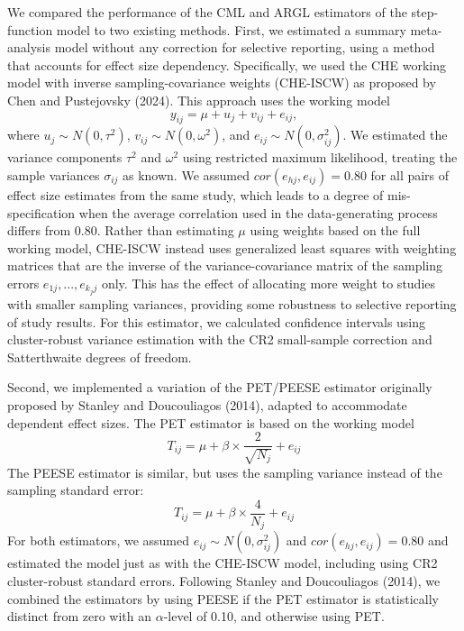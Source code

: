 \documentclass[
  man, donotrepeattitle,floatsintext]{apa7}
\begin{document}
We compared the performance of the CML and ARGL estimators of the step-function model to two
existing methods.
First, we estimated a summary meta-analysis model without any correction for selective reporting, using a method that accounts for effect size dependency.
Specifically, we used the CHE working model with inverse sampling-covariance weights (CHE-ISCW) as proposed by Chen and Pustejovsky (2024).
This approach uses the working model
\begin{equation}
\label{eq:che}
y_{ij} = \mu + u_j + v_{ij} + e_{ij},
\end{equation}
where \(u_j \sim N(0, \tau^2)\), \(v_{ij} \sim N(0, \omega^2)\), and \(e_{ij} \sim N(0, \sigma_{ij}^2)\).
We estimated the variance components \(\tau^2\) and \(\omega^2\) using restricted maximum likelihood, treating the sample variances \(\sigma_{ij}\) as known.
We assumed \(cor(e_{hj},e_{ij} )=0.80\) for all pairs of effect size estimates from the same study, which leads to a
degree of mis-specification when the average correlation used in the data-generating process differs from 0.80.
Rather than estimating \(\mu\) using weights based on the full working model, CHE-ISCW instead uses generalized least squares with weighting matrices that are the inverse of the variance-covariance matrix of the sampling errors \(e_{1j},...,e_{k_j j}\) only.
This has the effect of allocating more weight to studies with smaller sampling variances, providing some robustness to selective reporting of study results.
For this estimator, we calculated confidence intervals using cluster-robust variance estimation with the CR2 small-sample correction and Satterthwaite degrees of freedom.

Second, we implemented a variation of the PET/PEESE estimator originally proposed by Stanley and Doucouliagos (2014), adapted to
accommodate dependent effect sizes. The PET estimator is based on the
working model \begin{equation}
\label{eq:pet}
T_{ij} = \mu + \beta \times \frac{2}{\sqrt{N_j}} + e_{ij}
\end{equation} The PEESE estimator is similar, but uses the sampling
variance instead of the sampling standard error: \begin{equation}
\label{eq:peese}
T_{ij} = \mu + \beta \times \frac{4}{N_j} + e_{ij}
\end{equation} For both estimators, we assumed
\(e_{ij} \sim N(0, \sigma_{ij}^2)\) and \(cor(e_{hj},e_{ij} )=0.80\) and
estimated the model just as with the CHE-ISCW model, including using
CR2 cluster-robust standard errors. Following Stanley and Doucouliagos (2014), we combined
the estimators by using PEESE if the PET estimator is statistically
distinct from zero with an \(\alpha\)-level of 0.10, and otherwise using PET.
\end{document}
